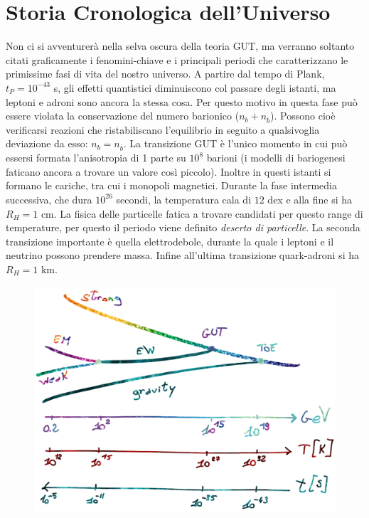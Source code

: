 \chapter{Storia Cronologica dell'Universo}\label{5:ch}

Non ci si avventurerà nella selva oscura della teoria GUT, ma verranno soltanto citati graficamente i fenomini-chiave e i principali periodi che caratterizzano le primissime fasi di vita del nostro universo. A partire dal tempo di Plank, $t_P=10^{-43}$ s, gli effetti quantistici diminuiscono col passare degli istanti, ma leptoni e adroni sono ancora la stessa cosa. Per questo motivo in questa fase può essere violata la conservazione del numero barionico ($n_b + n_{\overbar{b}}$). Possono cioè verificarsi reazioni che ristabiliscano l'equilibrio in seguito a qualsivoglia deviazione da esso: $n_b = n_{\overbar{b}}$. La transizione GUT è l'unico momento in cui può essersi formata l'anisotropia di 1 parte su $10^8$ barioni (i modelli di bariogenesi faticano ancora a trovare un valore così piccolo). Inoltre in questi istanti si formano le cariche, tra cui i monopoli magnetici. Durante la fase intermedia successiva, che dura $10^{26}$ secondi, la temperatura cala di $12$ dex e alla fine si ha $R_H = 1$ cm. La fisica delle particelle fatica a trovare candidati per questo range di temperature, per questo il periodo viene definito \textit{deserto di particelle}. La seconda transizione importante è quella elettrodebole, durante la quale i leptoni e il neutrino possono prendere massa. Infine all'ultima transizione quark-adroni si ha $R_H = 1$ km. 

\begin{figure}[H]
    \centering
    \includegraphics[width=.75 \textwidth]{Pictures/5/fasiprimordiali.png}
    \label{fig:4}
\end{figure}


